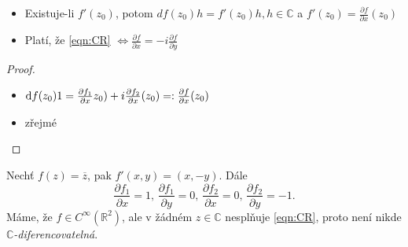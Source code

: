 
\begin{note}\mbox{}
\begin{itemize}
    \item Existuje-li $f'(z_0)$, potom $df(z_0)h = f'(z_0)h, h \in \mathbb{C}$ a $f'(z_0) = \frac{\partial f}{\partial x}(z_0)$ %
    \item Platí, že \cref{eqn:CR}
    $\iff \frac{\partial f}{\partial x}    = -i\frac{\partial f}{\partial y}$
\end{itemize}
\end{note}

\begin{proof}\mbox{}
\begin{itemize}
    \item $\mathop{}\!\mathrm{d} f(z_0)1 = \frac{\partial f_1}{\partial x}z_0) + i\frac{\partial f_2}{\partial x}(z_0) =: \frac{\partial f}{\partial x}(z_0)$
    \item zřejmé %
\end{itemize}
\end{proof}

\begin{example}
Nechť $f(z) = \overline{z}$, pak $f'(x,y) = (x,-y)$. %
Dále 
$$\frac{\partial f_1}{\partial x} = 1\text{, } \frac{\partial f_1}{\partial y} = 0\text{, } \frac{\partial f_2}{\partial x} = 0\text{, } \frac{\partial f_2}{\partial y} = -1\text{.}$$
Máme, že $f\in C^\infty(\mathbb{R}^2)$, ale v žádném $z\in \mathbb{C}$ nesplňuje \cref{eqn:CR}, proto není nikde\\ $\mathbb{C}$\emph{-diferencovatelná}.
\end{example}
